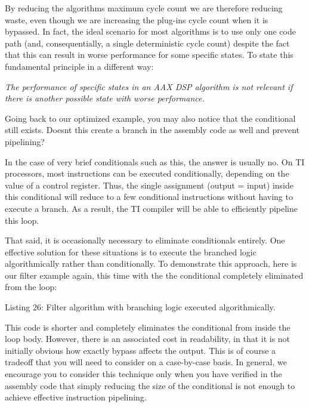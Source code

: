 By reducing the algorithm\textquotesingle{}s maximum cycle count we are therefore reducing waste, even though we are increasing the plug-\/in\textquotesingle{}s cycle count when it is bypassed. In fact, the ideal scenario for most algorithms is to use only one code path (and, consequentially, a single deterministic cycle count) despite the fact that this can result in worse performance for some specific states. To state this fundamental principle in a different way\+:

 {\itshape The performance of specific states in an A\+AX D\+SP algorithm is not relevant if there is another possible state with worse performance.} 

Going back to our optimized example, you may also notice that the conditional still exists. Doesn\textquotesingle{}t this create a branch in the assembly code as well and prevent pipelining?

In the case of very brief conditionals such as this, the answer is usually no. On TI processors, most instructions can be executed conditionally, depending on the value of a control register. Thus, the single assignment {\ttfamily (output = input)} inside this conditional will reduce to a few conditional instructions without having to execute a branch. As a result, the TI compiler will be able to efficiently pipeline this loop.

That said, it is occasionally necessary to eliminate conditionals entirely. One effective solution for these situations is to execute the branched logic algorithmically rather than conditionally. To demonstrate this approach, here is our filter example again, this time with the the conditional completely eliminated from the loop\+:


\begin{DoxyCode}{0}
\DoxyCodeLine{\{}
\DoxyCodeLine{\} }
\end{DoxyCode}
  Listing 26\+: Filter algorithm with branching logic executed algorithmically.

This code is shorter and completely eliminates the conditional from inside the loop body. However, there is an associated cost in readability, in that it is not initially obvious how exactly {\ttfamily bypass} affects the output. This is of course a tradeoff that you will need to consider on a case-\/by-\/case basis. In general, we encourage you to consider this technique only when you have verified in the assembly code that simply reducing the size of the conditional is not enough to achieve effective instruction pipelining.

